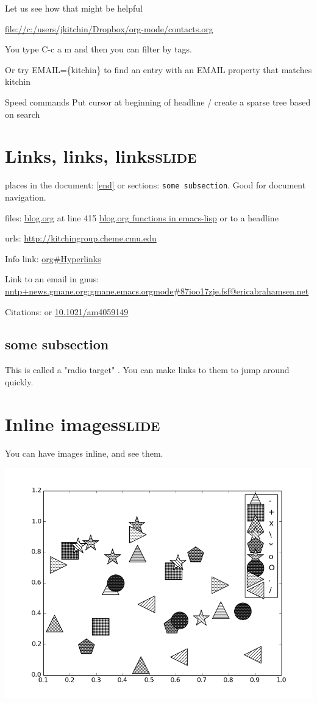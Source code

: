 \documentclass[11pt]{article}
\begin{document}
Let us see how that might be helpful

\url{file://c:/users/jkitchin/Dropbox/org-mode/contacts.org}

You type C-c a m
and then you can filter by tags. 

Or try EMAIL=\{kitchin\} to find an entry with an EMAIL property that matches kitchin

Speed commands
Put cursor at beginning of headline
/ create a sparse tree based on search

\section{Links, links, links\hfill{}\textsc{slide}}
\label{sec-7}

places in the document: \ref{end} or sections: \texttt{some subsection}. Good for document navigation.

files: \url{blog.org} at line 415
\href{blog.org}{\url{blog.org} functions in emacs-lisp} or to a headline

urls: \url{http://kitchingroup.cheme.cmu.edu}

Info link: \url{org#Hyperlinks}

Link to an email in gnus:
\href{nntp\%2Bnews.gmane.org:gmane.emacs.orgmode#87ioo17zje.fsf@ericabrahamsen.net}{\url{nntp+news.gmane.org:gmane.emacs.orgmode#87ioo17zje.fsf@ericabrahamsen.net}}

Citations: \cite{mehta-2014-ident-poten} or \url{10.1021/am4059149}

\cite{calle-vallejo-2013-number,hallenbeck-2013-effec-o2,mao-2013-inter}
\subsection{some subsection}
\label{sec-7-1}

This is called a "radio target" \label{end}. You can make links to them to jump around quickly.

\section{Inline images\hfill{}\textsc{slide}}
\label{sec-8}

You can have images inline, and see them.

\includegraphics[width=.9\linewidth]{./images/hatched-symbols.png}
\end{document}
